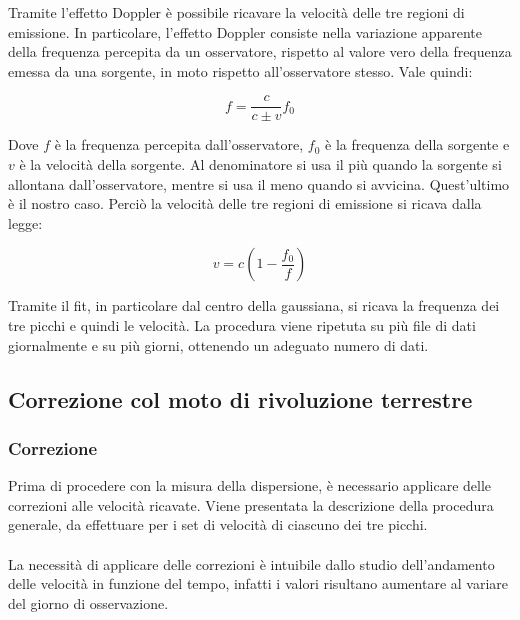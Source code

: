 Tramite l'effetto Doppler è possibile ricavare la velocità delle tre regioni di emissione. In particolare, l'effetto Doppler consiste nella variazione apparente della frequenza percepita da un osservatore, rispetto al valore vero della frequenza emessa da una sorgente, in moto rispetto all'osservatore stesso. Vale quindi:

\begin{equation}
    f=\frac{c}{c\pm v}f_{0}
\end{equation}

Dove $f$ è la frequenza percepita dall'osservatore, $f_{0}$ è la frequenza della sorgente e $v$ è la velocità della sorgente. Al denominatore si usa il più quando la sorgente si allontana dall'osservatore, mentre si usa il meno quando si avvicina. Quest'ultimo è il nostro caso. Perciò la velocità delle tre regioni di emissione si ricava dalla legge:

\begin{equation}
    v=c (1-\frac{f_{0}}{f})
\end{equation}

Tramite il fit, in particolare dal centro della gaussiana,  si ricava la frequenza dei tre picchi e quindi le velocità. La procedura viene ripetuta su più file di dati giornalmente e su più giorni, ottenendo un adeguato numero di dati.


\subsection{Correzione col moto di rivoluzione terrestre}

\subsubsection{Correzione}

Prima di procedere con la misura della dispersione, è necessario applicare delle correzioni alle velocità ricavate. Viene presentata la descrizione della procedura generale, da effettuare per i set di velocità di ciascuno dei tre picchi.
\\\\
La necessità di applicare delle correzioni è intuibile dallo studio dell'andamento delle velocità in funzione del tempo, infatti i valori risultano aumentare al variare del giorno di osservazione. 

